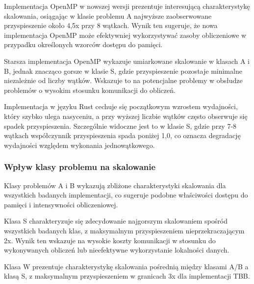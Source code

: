 Implementacja OpenMP w nowszej wersji prezentuje interesującą charakterystykę skalowania, osiągając w klasie problemu A najwyższe zaobserwowane przyspieszenie około 4,5x przy 8 wątkach. Wynik ten sugeruje, że nowa implementacja OpenMP może efektywniej wykorzystywać zasoby obliczeniowe w przypadku określonych wzorców dostępu do pamięci.

Starsza implementacja OpenMP wykazuje umiarkowane skalowanie w klasach A i B, jednak znacząco gorsze w klasie S, gdzie przyspieszenie pozostaje minimalne niezależnie od liczby wątków. Wskazuje to na potencjalne problemy w obsłudze problemów o wysokim stosunku komunikacji do obliczeń.

Implementacja w języku Rust cechuje się początkowym wzrostem wydajności, który szybko ulega nasyceniu, a przy wyższej liczbie wątków często obserwuje się spadek przyspieszenia. Szczególnie widoczne jest to w klasie S, gdzie przy 7-8 wątkach współczynnik przyspieszenia spada poniżej 1,0, co oznacza degradację wydajności względem wykonania jednowątkowego.

\subsubsection{Wpływ klasy problemu na skalowanie}
Klasy problemów A i B wykazują zbliżone charakterystyki skalowania dla wszystkich badanych implementacji, co sugeruje podobne właściwości dostępu do pamięci i intensywności obliczeniowej.

Klasa S charakteryzuje się zdecydowanie najgorszym skalowaniem spośród wszystkich badanych klas, z maksymalnym przyspieszeniem nieprzekraczającym 2x. Wynik ten wskazuje na wysokie koszty komunikacji w stosunku do wykonywanych obliczeń lub nieefektywne wykorzystanie lokalności danych.

Klasa W prezentuje charakterystykę skalowania pośrednią między klasami A/B a klasą S, z maksymalnym przyspieszeniem w granicach 3x dla implementacji TBB.


